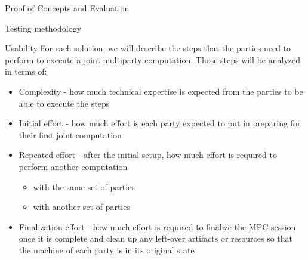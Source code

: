 \begin{frame}{Proof of Concepts and Evaluation}
\begin{block}{Testing methodology}
\begin{block}{Usability}
\label{thesis__030-methods.md__usability}
For each solution, we will describe the steps that the parties need to perform to execute a joint multiparty computation. Those steps will be analyzed in terms of:

\begin{itemize}
\tightlist
\item
  Complexity - how much technical expertise is expected from the parties to be able to execute the steps
\item
  Initial effort - how much effort is each party expected to put in preparing for their first joint computation
\item
  Repeated effort - after the initial setup, how much effort is required to perform another computation

  \begin{itemize}
  \tightlist
  \item
    with the same set of parties
  \item
    with another set of parties
  \end{itemize}
\item
  Finalization effort - how much effort is required to finalize the MPC session once it is complete and clean up any left-over artifacts or resources so that the machine of each party is in its original state
\end{itemize}
\end{block}
\end{block}
\end{frame}

